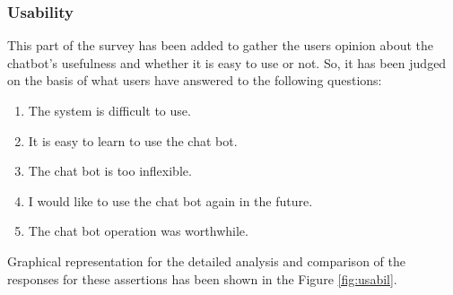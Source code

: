 \subsubsection*{Usability}
This part of the survey has been added to gather the users opinion about the chatbot's usefulness and whether it is easy to use or not. So, it has been judged on the basis of what users have answered to the following questions:
\begin{enumerate}
    \item The system is difficult to use.
    \item It is easy to learn to use the chat bot.
    \item The chat bot is too inflexible.
    \item I would like to use the chat bot again in the future.
    \item The chat bot operation was worthwhile.
\end{enumerate}
Graphical representation for the detailed analysis and comparison of the responses for these assertions has been shown in the Figure \ref{fig:usabil}.

